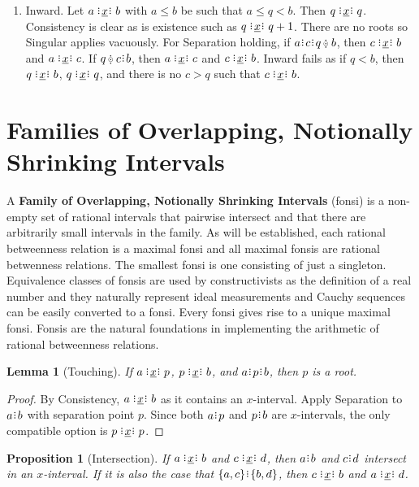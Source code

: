 \documentclass[12pt]{article}
\newtheorem{lemma}{Lemma}[section]
\newtheorem{proposition}{Proposition}[section]
\begin{document}
\begin{enumerate}
    \item Inward. Let $a \xrel b$ with $a \leq b$ be such that $a \leq q < b$. Then \sout{$q \xrel q$}. Consistency is clear as is existence such as $q\xrel q+1$. There are no roots so Singular applies vacuously. For Separation holding, if $a \rint c \rint q \betneq b$, then $c\xrel b$ and \sout{$a \xrel c$}. If $q \betneq c \rint b$, then $a \xrel c$ and \sout{$c \xrel b$}. Inward fails as if $q < b$, then $q \xrel b$, \sout{$q \xrel q$}, and there is no $c > q$ such that $c \xrel b$.
\end{enumerate}


\section{Families of Overlapping, Notionally Shrinking Intervals}

A \textbf{Family of Overlapping, Notionally Shrinking Intervals} (fonsi) is a non-empty set of rational intervals that pairwise intersect and that there are arbitrarily small intervals in the family. As will be established, each rational betweenness relation is a maximal fonsi and all maximal fonsis are rational betwenness relations. The smallest fonsi is one consisting of just a singleton. Equivalence classes of fonsis are used by constructivists as the definition of a real number and they naturally represent ideal measurements and Cauchy sequences can be easily converted to a fonsi. Every fonsi gives rise to a unique maximal fonsi. Fonsis are the natural foundations in implementing the arithmetic of rational betweenness relations. 


\begin{lemma}[Touching]\label{br--cor--endpointed}
    If $a \xrel p$, $p \xrel b$, and $a \rint p \rint b$, then $p$ is a root.
\end{lemma}

\begin{proof}
    By Consistency, $a \xrel b$ as it contains an $x$-interval. Apply Separation to $a \rint b$ with separation point $p$. Since both $a \rint p$ and $p \rint b$ are $x$-intervals, the only compatible option is $p \xrel p$.
\end{proof}


\begin{proposition}[Intersection]\label{br--intersect}
    If $a \xrel b$ and $c \xrel d$, then $a \rint b$ and $c\rint d$ intersect in an $x$-interval. If it is also the case that  $\{a, c\} \rint \{b, d\}$, then  $c \xrel b$ and $a \xrel d$.
\end{proposition}
\end{document}

